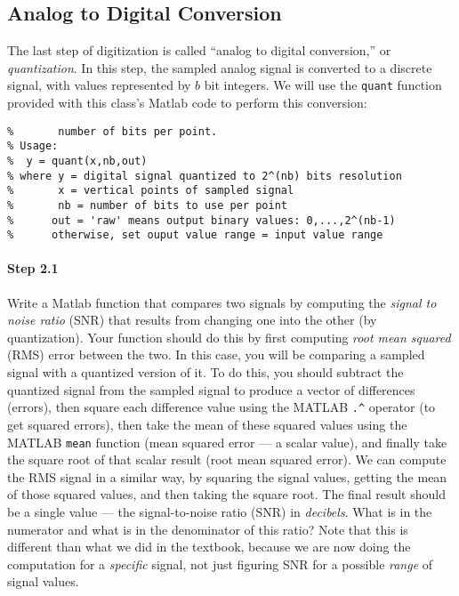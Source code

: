 \subsection{Analog to Digital Conversion}

The last step of digitization is called ``analog to digital
conversion,'' or \emph{quantization}. In this step, the sampled analog
signal is converted to a discrete signal, with values represented by
$b$ bit integers. We will use the \texttt{quant} function provided
with this class's Matlab code to perform this conversion:
\begin{lstlisting}[style=Matlab-editor,basicstyle=\mlttfamily\small]
% QUANT Quantize a sampled (discrete) signal using a prescribed
%       number of bits per point.
% Usage:
%  y = quant(x,nb,out)
% where y = digital signal quantized to 2^(nb) bits resolution
%       x = vertical points of sampled signal
%       nb = number of bits to use per point
%      out = 'raw' means output binary values: 0,...,2^(nb-1)
%      otherwise, set ouput value range = input value range
\end{lstlisting}

\paragraph{Step 2.1} Write a Matlab function that compares two signals
by computing the \emph{signal to noise ratio} (SNR) that results from
changing one into the other (by quantization). Your function should do
this by first computing \emph{root mean squared} (RMS) error between
the two. In this case, you will be comparing a sampled signal with a
quantized version of it.  To do this, you should subtract the
quantized signal from the sampled signal to produce a vector of
differences (errors), then square each difference value using the
MATLAB \verb|.^| operator (to get squared errors), then take the mean
of these squared values using the MATLAB \verb|mean| function (mean
squared error --- a scalar value), and finally take the square root of
that scalar result (root mean squared error). We can compute the RMS
signal in a similar way, by squaring the signal values, getting the
mean of those squared values, and then taking the square root. The
final result should be a single value --- the signal-to-noise ratio
(SNR) in \emph{decibels}. What is in the numerator and what is in the
denominator of this ratio? Note that this is different than what we
did in the textbook, because we are now doing the computation for a
\emph{specific} signal, not just figuring SNR for a possible
\emph{range} of signal values.



